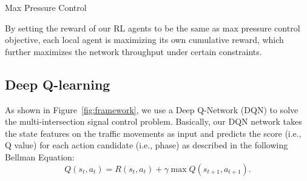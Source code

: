 \begin{algorithm}[H]


 \caption{Max Pressure Control}
 \label{alg:mp}
\end{algorithm}


By setting the reward of our RL agents to be the same as max pressure control objective, each local agent is maximizing its own cumulative reward, which further maximizes the network throughput under certain constraints.



 
 



\subsection{Deep Q-learning}
As shown in Figure~\ref{fig:framework}, we use a Deep Q-Network (DQN) to solve the multi-intersection signal control problem. Basically, our DQN network takes the state features on the traffic movements as input and predicts the score (i.e., Q value) for each action candidate (i.e., phase) as described in the following Bellman Equation:
\begin{equation}
Q(s_t,a_t)=R(s_t, a_t)+\gamma \max Q(s_{t+1}, a_{t+1}).
\label{eq:bellman}
\end{equation}

